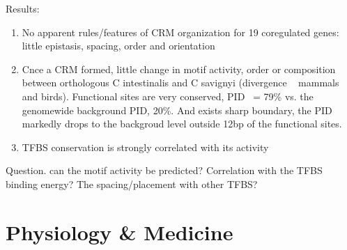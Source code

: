 \documentclass{report}
\begin{document}
\begin{enumerate}
	Results:
	\begin{enumerate}
		\item No apparent rules/features of CRM organization for 19 coregulated genes: little epistasis, spacing, order and orientation
		\item Cnce a CRM formed, little change in motif activity, order or composition between orthologous C intestinalis and C savignyi (divergence ~ mammals and birds). Functional sites are very conserved, PID ~= 79\% vs. the genomewide background PID, 20\%. And exists sharp boundary, the PID markedly drops to the backgroud level outside 12bp of the functional sites. 
		\item TFBS conservation is strongly correlated with its activity
	\end{enumerate}
	
	Question. can the motif activity be predicted? Correlation with the TFBS binding energy? The spacing/placement with other TFBS?
	
\end{enumerate}
\chapter{Physiology \& Medicine}
\end{document}

